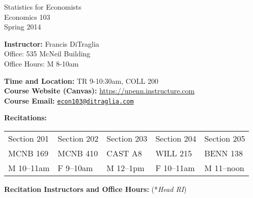 \documentclass[11pt, letterpaper]{article}
\begin{document}
\thispagestyle{plain}

\begin{center}
\Large
\sc
Statistics for Economists\\
\large
Economics 103\\
\large
Spring 2014\\
\end{center}


\normalsize

\noindent \textbf{Instructor:} Francis DiTraglia \\
Office: 535 McNeil Building\\
Office Hours: M 8-10am

\bigskip
 
\noindent \textbf{Time and Location:} TR 9-10:30am, COLL 200  \\
 
 
\noindent \textbf{Course Website (Canvas):} \url{https://upenn.instructure.com}\\
\noindent \textbf{Course Email:} \href{mailto:econ103@ditraglia.com}{\texttt{econ103@ditraglia.com}}
\medskip

\noindent \textbf{Recitations:}
\medskip \noindent

\begin{tabular}{lllll}
	Section 201 & Section 202 & Section 203 & Section 204 & Section 205\\
	MCNB 169 & MCNB 410 & CAST A8 & WILL 215 & BENN 138\\ 
	M 10--11am & F 9--10am & M 12--1pm & F 10--11am & M 11--noon
\end{tabular}

\medskip

\noindent \textbf{Recitation Instructors and Office Hours:}
{\footnotesize (*\emph{Head RI})}

\medskip
\noindent
\end{document}

